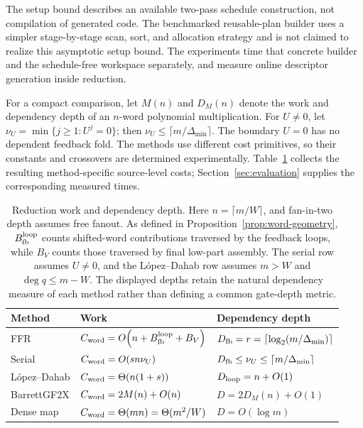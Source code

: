 \documentclass{mcom-l}
\numberwithin{equation}{section}
\theoremstyle{definition}
\theoremstyle{remark}
\newcommand{\Dmin}{\Delta_{\min}}
\begin{document}
The setup bound describes an available two-pass schedule construction, not
compilation of generated code.  The benchmarked reusable-plan builder uses a
simpler stage-by-stage scan, sort, and allocation strategy and is not claimed
to realize this asymptotic setup bound.  The experiments time that concrete
builder and the schedule-free workspace separately, and measure online
descriptor generation inside reduction.

For a compact comparison, let $M(n)$ and $D_M(n)$ denote the work and
dependency depth of an $n$-word polynomial multiplication.  For $U\ne0$, let
$\nu_U=\min\{j\ge1:U^j=0\}$; then
$\nu_U\le\lceil m/\Dmin\rceil$.  The boundary $U=0$ has no dependent
feedback fold.  The methods use different cost primitives, so their constants
and crossovers are determined experimentally.
Table~\ref{tab:method-complexity} collects the resulting method-specific
source-level costs; Section~\ref{sec:evaluation} supplies the corresponding
measured times.

\begin{table}[t]
\caption{Reduction work and dependency depth.  Here
$n=\lceil m/W\rceil$, and fan-in-two depth assumes free fanout.
As defined in Proposition~\ref{prop:word-geometry},
$B_{\rm fb}^{\rm loop}$ counts shifted-word contributions traversed by the
feedback loops, while $B_V$ counts those traversed by final low-part assembly.
The serial row assumes $U\ne0$, and the L\'opez--Dahab row assumes
$m>W$ and $\deg q\le m-W$.  The displayed depths retain the natural dependency
measure of each method rather than defining a common gate-depth metric.}
\label{tab:method-complexity}
\centering
\footnotesize
\renewcommand{\arraystretch}{1.35}
\begin{tabular}{@{}
  >{\raggedright\arraybackslash}p{}
  >{\centering\arraybackslash}p{}
  >{\centering\arraybackslash}p{}@{}}
\toprule
Method & Work & Dependency depth\\
\midrule
FFR
& $C_{\rm word}=O\!\left(n+B_{\rm fb}^{\rm loop}+B_V\right)$
& $D_{\rm fb}=r=\left\lceil\log_2(m/\Dmin)\right\rceil$\\
\midrule
Serial
& $C_{\rm word}=O(sn\nu_U)$
& $D_{\rm fb}\le\nu_U\le\left\lceil m/\Dmin\right\rceil$\\
\midrule
L\'opez--Dahab
& $C_{\rm word}=\Theta\!\left(n(1+s)\right)$
& $D_{\rm loop}=n+O(1)$\\
\midrule
BarrettGF2X
& $C_{\rm word}=2M(n)+O(n)$
& $D=2D_M(n)+O(1)$\\
\midrule
Dense map
& $C_{\rm word}=\Theta(mn)=\Theta(m^2/W)$
& $D=O(\log m)$\\
\bottomrule
\end{tabular}
\renewcommand{\arraystretch}{1}
\end{table}
\end{document}
